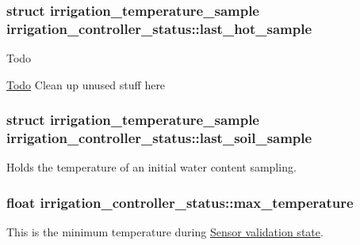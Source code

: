\subsubsection[{last\+\_\+hot\+\_\+sample}]{\setlength{\rightskip}{0pt plus 5cm}struct {\bf irrigation\+\_\+temperature\+\_\+sample} irrigation\+\_\+controller\+\_\+status\+::last\+\_\+hot\+\_\+sample}\label{structirrigation__controller__status_ab795e232c4e2d405b11e24312a6163c3}
\begin{DoxyRefDesc}{Todo}
\item[\hyperlink{todo__todo000004}{Todo}]Clean up unused stuff here \end{DoxyRefDesc}
\hypertarget{structirrigation__controller__status_a2d3ef640dc3ec8ce2789fffb092d8f80}{}
\subsubsection[{last\+\_\+soil\+\_\+sample}]{\setlength{\rightskip}{0pt plus 5cm}struct {\bf irrigation\+\_\+temperature\+\_\+sample} irrigation\+\_\+controller\+\_\+status\+::last\+\_\+soil\+\_\+sample}\label{structirrigation__controller__status_a2d3ef640dc3ec8ce2789fffb092d8f80}


Holds the temperature of an initial water content sampling. 

\hypertarget{structirrigation__controller__status_a1bd8f83a44ee01d3b7cf3851b6716f02}{}
\subsubsection[{max\+\_\+temperature}]{\setlength{\rightskip}{0pt plus 5cm}float irrigation\+\_\+controller\+\_\+status\+::max\+\_\+temperature}\label{structirrigation__controller__status_a1bd8f83a44ee01d3b7cf3851b6716f02}


This is the minimum temperature during \hyperlink{group__state__validate}{Sensor validation state}. 

\hypertarget{structirrigation__controller__status_a451e58983d5995bf6f1e00f9318d5dd6}{}
